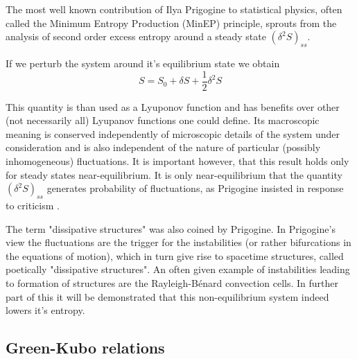 \documentclass[a4paper,12pt]{article}
\begin{document}
The most well known contribution of Ilya Prigogine to statistical physics, often called the Minimum Entropy Production (MinEP) principle, sprouts from the analysis of second order excess entropy around a steady state $ (\delta^2 S)_{ss} $. 

If we perturb the system around it's equilibrium state we obtain
\begin{equation}
  S=S_0 + \delta S + \frac{1}{2}\delta^2 S
\end{equation}

This quantity is than used as a Lyuponov function and has benefits over other (not necessarily all) Lyupanov functions one could define. 
Its macroscopic meaning is conserved independently of microscopic details of the system under consideration and is also independent of the nature of particular (possibly inhomogeneous) fluctuations.
It is important however, that this result holds only for steady states near-equilibrium. It is only near-equilibrium that the quantity $ (\delta^2 S)_{ss} $ generates probability of fluctuations, as Prigogine insisted in response to criticism \cite{Nicolis:1979cv}. 

The term "dissipative structures" was also coined by Prigogine.
In Prigogine's view the fluctuations are the trigger for the instabilities (or rather bifurcations in the equations of motion), which in turn give rise to spacetime structures, called poetically "dissipative structures". 
An often given example of instabilities leading to formation of structures are the Rayleigh-Bénard convection cells. In further part of this it will be demonstrated that this non-equilibrium system indeed lowers it's entropy.

\subsection{Green-Kubo relations}



\end{document}

